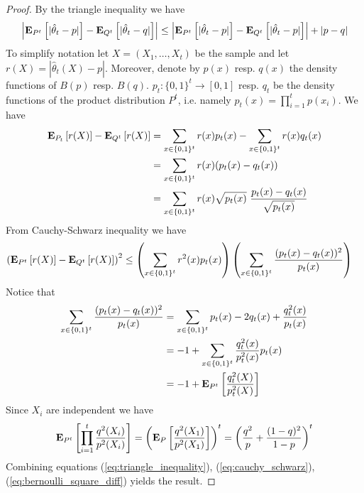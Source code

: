\begin{proof}
  By the triangle inequality we have
  \begin{equation}\label{eq:triangle_inequality}
    \left|
    \bm{\mathrm{E}}_{P^t} \left[ |\hat{\theta}_t-p | \right] -
    \bm{\mathrm{E}}_{Q^t} \left[ |\hat{\theta}_t-q | \right]
    \right|
    \leq
    \left|
    \bm{\mathrm{E}}_{P^t} \left[ |\hat{\theta}_t-p | \right] -
    \bm{\mathrm{E}}_{Q^t} \left[ |\hat{\theta}_t-p | \right]
    \right|
    + |p - q|
  \end{equation}
  To simplify notation let $X = (X_1, \ldots, X_t)$ be the sample and let
  $r(X) = | \hat{\theta}_t(X)  - p |$. Moreover, denote
  by $p(x)$ resp. $q(x)$ the density functions of $B(p)$ resp. $B(q)$.
  $p_t: \{0,1\}^t \to [0,1]$ resp. $q_t$ be the density functions of
  the product distribution $P^t$, i.e.
  namely $p_t(x) = \prod_{i=1}^t p(x_i)$.
  We have
  \begin{align*}
    \bm{\mathrm{E}}_{P_t} \left[ r(X) \right] - \bm{\mathrm{E}}_{Q^t} \left[ r(X) \right]
    &=
    \sum_{x \in \{0,1\}^t} r(x) p_t(x) -
    \sum_{x \in \{0,1\}^t} r(x) q_t(x)
    \\
    &=
    \sum_{x \in \{0,1\}^t} r(x) (p_t(x) - q_t(x))  \\
    &=
    \sum_{x \in \{0,1\}^t} r(x) \sqrt{p_t(x)}\
    \frac{p_t(x) - q_t(x)}{\sqrt{p_t(x)}}
  \end{align*}
  From Cauchy-Schwarz inequality we have
  \begin{align}\label{eq:cauchy_schwarz}
    \left(\bm{\mathrm{E}}_{P^t} \left[ r(X) \right] - \bm{\mathrm{E}}_{Q^t} \left[ r(X) \right]\right)^2
    &\leq
    \left(
    \sum_{x \in \{0,1\}^t} r^2(x) p_t(x)
    \right)
    \left(
    \sum_{x \in \{0,1\}^t} \frac{(p_t(x) - q_t(x))^2}{p_t(x)}
    \right)
  \end{align}
  Notice that
  \begin{align*}
    \sum_{x \in \{0,1\}^t} \frac{(p_t(x) - q_t(x))^2}{p_t(x)}
    &=
    \sum_{x \in \{0,1\}^t} p_t(x) - 2 q_t(x) + \frac{q_t^2(x)}{p_t(x)}\\
    &=
    -1 + \sum_{x \in \{0,1\}^t} \frac{q_t^2(x)}{p_t^2(x)} p_t(x)\\
    &=
    -1 + \bm{\mathrm{E}}_{P^t} \left[ \frac{q_t^2(X)}{p_t^2(X)} \right]
  \end{align*}
  Since $X_i$ are independent we have
  \begin{equation}\label{eq:bernoulli_square_diff}
    \bm{\mathrm{E}}_{P^t} \left[ \prod_{i=1}^t\frac{ q^2(X_i)}{p^2(X_i)} \right]
    =
    \left(\bm{\mathrm{E}}_{P} \left[ \frac{ q^2(X_1)}{p^2(X_1)} \right]\right)^t
    = \left( \frac{q^2}{p} + \frac{(1-q)^2}{1-p} \right)^t
  \end{equation}
  Combining equations
  (\ref{eq:triangle_inequality}),
  (\ref{eq:cauchy_schwarz}),
  (\ref{eq:bernoulli_square_diff}) yields the result.
\end{proof}

